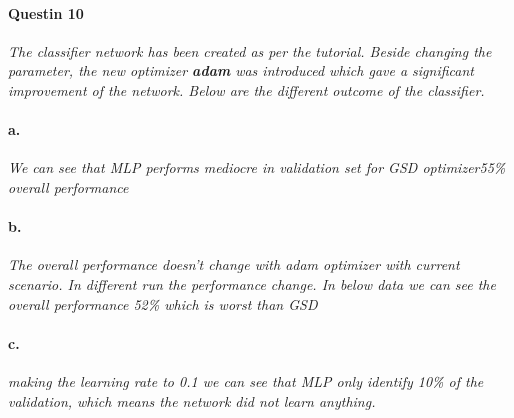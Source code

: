 \documentclass[a4 paper]{article}
\begin{document}
\paragraph{Questin 10} \textit{The classifier network has been created as per the tutorial. Beside changing the parameter, the new optimizer \textbf{adam} was introduced which gave a significant improvement of the network. Below are the different outcome of the classifier.}

\paragraph{a.} \textit{We can see that MLP performs mediocre in validation set for GSD optimizer55\% overall performance}
\paragraph{b.} \textit{The overall performance doesn't change with adam optimizer with current scenario. In different run the performance change. In below data we can see the overall performance 52\% which is worst than GSD}
\paragraph{c.} \textit{making the learning rate to 0.1 we can see that MLP only identify 10\% of the validation, which means the network did not learn anything.}
\end{document}
